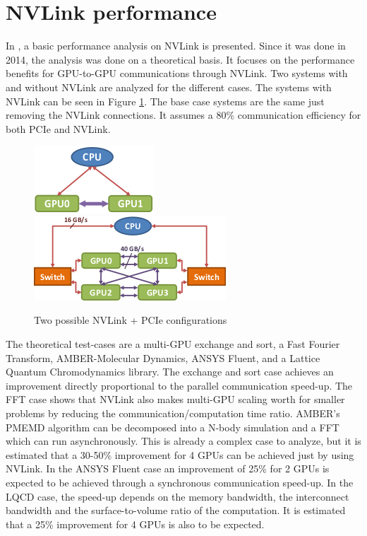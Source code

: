 \section{NVLink performance}
In \cite{nvidia:nvlinkperformance}, a basic performance analysis on NVLink is presented.
Since it was done in 2014, the analysis was done on a theoretical basis.
It focuses on the performance benefits for GPU-to-GPU communications through NVLink.
Two systems with and without NVLink are analyzed for the different cases.
The systems with NVLink can be seen in Figure \ref{fig:nvlinkconfigs}.
The base case systems are the same just removing the NVLink connections.
It assumes a 80\% communication efficiency for both PCIe and NVLink.

\begin{figure}[ht!]
    \centering
    \includegraphics[width=0.45\linewidth]{2gpus}\\
    \vspace*{0.5cm}
    \includegraphics[width=0.8\linewidth]{4gpus}
    \caption{Two possible NVLink + PCIe configurations}
    \label{fig:nvlinkconfigs}
\end{figure}

The theoretical test-cases are a multi-GPU exchange and sort, a Fast Fourier Transform, AMBER-Molecular Dynamics, ANSYS Fluent, and a Lattice Quantum Chromodynamics library.
The exchange and sort case achieves an improvement directly proportional to the parallel communication speed-up.
The FFT case shows that NVLink also makes multi-GPU scaling worth for smaller problems by reducing the communication/computation time ratio.
AMBER's PMEMD algorithm can be decomposed into a N-body simulation and a FFT which can run asynchronously.
This is already a complex case to analyze, but it is estimated that a 30-50\% improvement for 4 GPUs can be achieved just by using NVLink.
In the ANSYS Fluent case an improvement of 25\% for 2 GPUs is expected to be achieved through a synchronous communication speed-up.
In the LQCD case, the speed-up depends on the memory bandwidth, the interconnect bandwidth and the surface-to-volume ratio of the computation.
It is estimated that a 25\% improvement for 4 GPUs is also to be expected.
